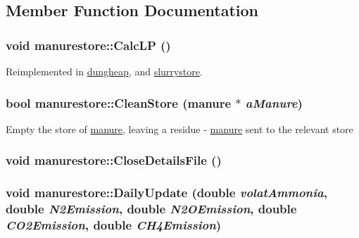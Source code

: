 \subsection{Member Function Documentation}
\hypertarget{classmanurestore_a4c5c76d30e639a9d791728d0e59e9cfa}{
\subsubsection[{CalcLP}]{\setlength{\rightskip}{0pt plus 5cm}void manurestore::CalcLP ()}}
\label{classmanurestore_a4c5c76d30e639a9d791728d0e59e9cfa}


Reimplemented in \hyperlink{classdungheap_af4b63f00620c98cefc7008b5bc6b2170}{dungheap}, and \hyperlink{classslurrystore_a307b2de3fb81bd7adfa90335f6371816}{slurrystore}.\hypertarget{classmanurestore_ac9c341a4ec87983d1b44c9c4b05c93a2}{
\subsubsection[{CleanStore}]{\setlength{\rightskip}{0pt plus 5cm}bool manurestore::CleanStore ({\bf manure} $\ast$ {\em aManure})}}
\label{classmanurestore_ac9c341a4ec87983d1b44c9c4b05c93a2}
Empty the store of \hyperlink{classmanure}{manure}, leaving a residue -\/ \hyperlink{classmanure}{manure} sent to the relevant store \hypertarget{classmanurestore_aff10675b3036964476b06dbcac290c89}{
\subsubsection[{CloseDetailsFile}]{\setlength{\rightskip}{0pt plus 5cm}void manurestore::CloseDetailsFile ()}}
\label{classmanurestore_aff10675b3036964476b06dbcac290c89}
\hypertarget{classmanurestore_a9305e9ead062b785f642bc3a8a5130d3}{
\subsubsection[{DailyUpdate}]{\setlength{\rightskip}{0pt plus 5cm}void manurestore::DailyUpdate (double {\em volatAmmonia}, \/  double {\em N2Emission}, \/  double {\em N2OEmission}, \/  double {\em CO2Emission}, \/  double {\em CH4Emission})}}
